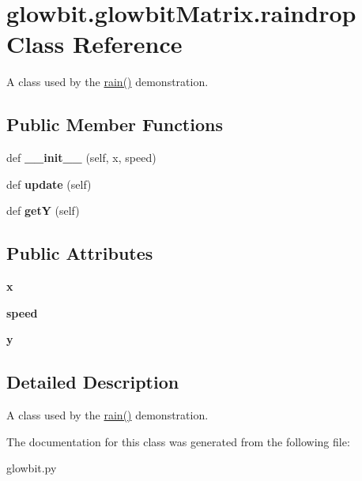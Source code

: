 \hypertarget{classglowbit_1_1glowbitMatrix_1_1raindrop}{}\section{glowbit.\+glowbit\+Matrix.\+raindrop Class Reference}
\label{classglowbit_1_1glowbitMatrix_1_1raindrop}


A class used by the \hyperlink{classglowbit_1_1glowbitMatrix_a690a172f923caeb55e3adf012ec0600c}{rain()} demonstration.  


\subsection*{Public Member Functions}
\begin{DoxyCompactItemize}
\item 
\mbox{\label{classglowbit_1_1glowbitMatrix_1_1raindrop_a5368f364866f8e2bbbb430f7bce8909c}} 
def {\bfseries \+\_\+\+\_\+init\+\_\+\+\_\+} (self, x, speed)
\item 
\mbox{\label{classglowbit_1_1glowbitMatrix_1_1raindrop_aeb03aa245ab1507c74474f6ed7918aa4}} 
def {\bfseries update} (self)
\item 
\mbox{\label{classglowbit_1_1glowbitMatrix_1_1raindrop_a8139214ebb75e44097147c61d254de5f}} 
def {\bfseries getY} (self)
\end{DoxyCompactItemize}
\subsection*{Public Attributes}
\begin{DoxyCompactItemize}
\item 
\mbox{\label{classglowbit_1_1glowbitMatrix_1_1raindrop_a4c481273b383e7ceed52eaa0f39a1a0a}} 
{\bfseries x}
\item 
\mbox{\label{classglowbit_1_1glowbitMatrix_1_1raindrop_ade3f6775e6494d001f52e04ae5626fcb}} 
{\bfseries speed}
\item 
\mbox{\label{classglowbit_1_1glowbitMatrix_1_1raindrop_a59a8135a4a81b2fa5f2cbfb225cf1575}} 
{\bfseries y}
\end{DoxyCompactItemize}


\subsection{Detailed Description}
A class used by the \hyperlink{classglowbit_1_1glowbitMatrix_a690a172f923caeb55e3adf012ec0600c}{rain()} demonstration. 

The documentation for this class was generated from the following file\+:\begin{DoxyCompactItemize}
\item 
glowbit.\+py\end{DoxyCompactItemize}
